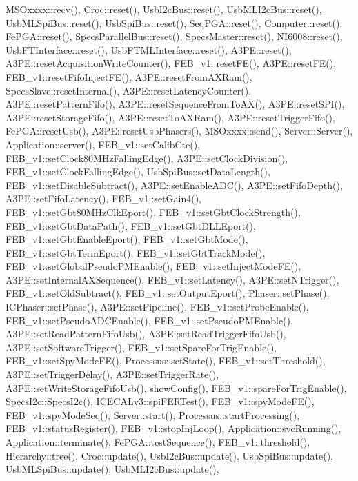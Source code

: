 M\+S\+Oxxxx\+::recv(), Croc\+::reset(), Usb\+I2c\+Bus\+::reset(), Usb\+M\+L\+I2c\+Bus\+::reset(), Usb\+M\+L\+Spi\+Bus\+::reset(), Usb\+Spi\+Bus\+::reset(), Seq\+P\+G\+A\+::reset(), Computer\+::reset(), Fe\+P\+G\+A\+::reset(), Specs\+Parallel\+Bus\+::reset(), Specs\+Master\+::reset(), N\+I6008\+::reset(), Usb\+F\+T\+Interface\+::reset(), Usb\+F\+T\+M\+L\+Interface\+::reset(), A3\+P\+E\+::reset(), A3\+P\+E\+::reset\+Acquisition\+Write\+Counter(), F\+E\+B\+\_\+v1\+::reset\+F\+E(), A3\+P\+E\+::reset\+F\+E(), F\+E\+B\+\_\+v1\+::reset\+Fifo\+Inject\+F\+E(), A3\+P\+E\+::reset\+From\+A\+X\+Ram(), Specs\+Slave\+::reset\+Internal(), A3\+P\+E\+::reset\+Latency\+Counter(), A3\+P\+E\+::reset\+Pattern\+Fifo(), A3\+P\+E\+::reset\+Sequence\+From\+To\+A\+X(), A3\+P\+E\+::reset\+S\+P\+I(), A3\+P\+E\+::reset\+Storage\+Fifo(), A3\+P\+E\+::reset\+To\+A\+X\+Ram(), A3\+P\+E\+::reset\+Trigger\+Fifo(), Fe\+P\+G\+A\+::reset\+Usb(), A3\+P\+E\+::reset\+Usb\+Phasers(), M\+S\+Oxxxx\+::send(), Server\+::\+Server(), Application\+::server(), F\+E\+B\+\_\+v1\+::set\+Calib\+Cte(), F\+E\+B\+\_\+v1\+::set\+Clock80\+M\+Hz\+Falling\+Edge(), A3\+P\+E\+::set\+Clock\+Division(), F\+E\+B\+\_\+v1\+::set\+Clock\+Falling\+Edge(), Usb\+Spi\+Bus\+::set\+Data\+Length(), F\+E\+B\+\_\+v1\+::set\+Disable\+Subtract(), A3\+P\+E\+::set\+Enable\+A\+D\+C(), A3\+P\+E\+::set\+Fifo\+Depth(), A3\+P\+E\+::set\+Fifo\+Latency(), F\+E\+B\+\_\+v1\+::set\+Gain4(), F\+E\+B\+\_\+v1\+::set\+Gbt80\+M\+Hz\+Clk\+Eport(), F\+E\+B\+\_\+v1\+::set\+Gbt\+Clock\+Strength(), F\+E\+B\+\_\+v1\+::set\+Gbt\+Data\+Path(), F\+E\+B\+\_\+v1\+::set\+Gbt\+D\+L\+L\+Eport(), F\+E\+B\+\_\+v1\+::set\+Gbt\+Enable\+Eport(), F\+E\+B\+\_\+v1\+::set\+Gbt\+Mode(), F\+E\+B\+\_\+v1\+::set\+Gbt\+Term\+Eport(), F\+E\+B\+\_\+v1\+::set\+Gbt\+Track\+Mode(), F\+E\+B\+\_\+v1\+::set\+Global\+Pseudo\+P\+M\+Enable(), F\+E\+B\+\_\+v1\+::set\+Inject\+Mode\+F\+E(), A3\+P\+E\+::set\+Internal\+A\+X\+Sequence(), F\+E\+B\+\_\+v1\+::set\+Latency(), A3\+P\+E\+::set\+N\+Trigger(), F\+E\+B\+\_\+v1\+::set\+Old\+Subtract(), F\+E\+B\+\_\+v1\+::set\+Output\+Eport(), Phaser\+::set\+Phase(), I\+C\+Phaser\+::set\+Phase(), A3\+P\+E\+::set\+Pipeline(), F\+E\+B\+\_\+v1\+::set\+Probe\+Enable(), F\+E\+B\+\_\+v1\+::set\+Pseudo\+A\+D\+C\+Enable(), F\+E\+B\+\_\+v1\+::set\+Pseudo\+P\+M\+Enable(), A3\+P\+E\+::set\+Read\+Pattern\+Fifo\+Usb(), A3\+P\+E\+::set\+Read\+Trigger\+Fifo\+Usb(), A3\+P\+E\+::set\+Software\+Trigger(), F\+E\+B\+\_\+v1\+::set\+Spare\+For\+Trig\+Enable(), F\+E\+B\+\_\+v1\+::set\+Spy\+Mode\+F\+E(), Processus\+::set\+State(), F\+E\+B\+\_\+v1\+::set\+Threshold(), A3\+P\+E\+::set\+Trigger\+Delay(), A3\+P\+E\+::set\+Trigger\+Rate(), A3\+P\+E\+::set\+Write\+Storage\+Fifo\+Usb(), show\+Config(), F\+E\+B\+\_\+v1\+::spare\+For\+Trig\+Enable(), Specs\+I2c\+::\+Specs\+I2c(), I\+C\+E\+C\+A\+Lv3\+::spi\+F\+E\+R\+Test(), F\+E\+B\+\_\+v1\+::spy\+Mode\+F\+E(), F\+E\+B\+\_\+v1\+::spy\+Mode\+Seq(), Server\+::start(), Processus\+::start\+Processing(), F\+E\+B\+\_\+v1\+::status\+Register(), F\+E\+B\+\_\+v1\+::stop\+Inj\+Loop(), Application\+::svc\+Running(), Application\+::terminate(), Fe\+P\+G\+A\+::test\+Sequence(), F\+E\+B\+\_\+v1\+::threshold(), Hierarchy\+::tree(), Croc\+::update(), Usb\+I2c\+Bus\+::update(), Usb\+Spi\+Bus\+::update(), Usb\+M\+L\+Spi\+Bus\+::update(), Usb\+M\+L\+I2c\+Bus\+::update(), 